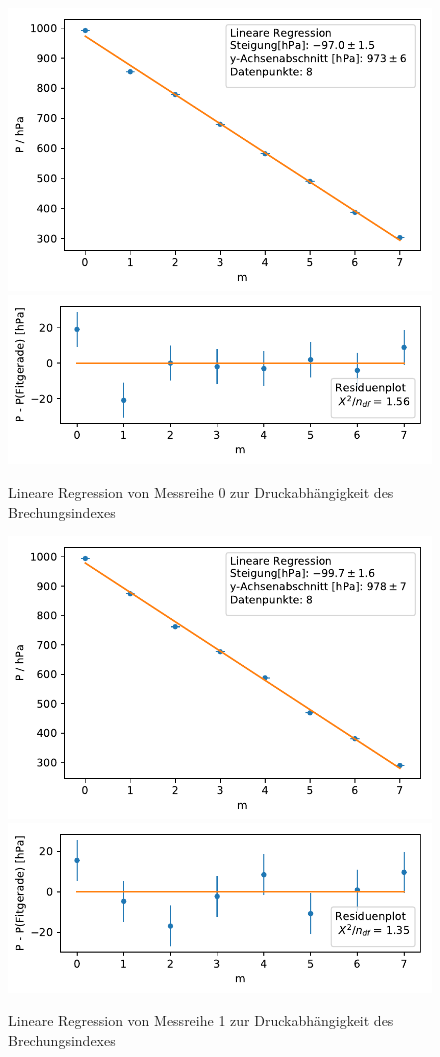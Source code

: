\documentclass[12pt,a4paper]{article}
\begin{document}
\begin{figure}[H]
	\centering
	\includegraphics[width=0.7\linewidth]{Python/MR0_LinReg_Druck.pdf}
	\includegraphics[width=0.7\linewidth]{Python/MR0_Residuen_Druck.pdf}
	\caption{Lineare Regression von Messreihe 0 zur Druckabhängigkeit des Brechungsindexes}
\end{figure}
\begin{figure}[H]
	\centering
	\includegraphics[width=0.7\linewidth]{Python/MR1_LinReg_Druck.pdf}
	\includegraphics[width=0.7\linewidth]{Python/MR1_Residuen_Druck.pdf}
	\caption{Lineare Regression von Messreihe 1 zur Druckabhängigkeit des Brechungsindexes}
\end{figure}
\end{document}
